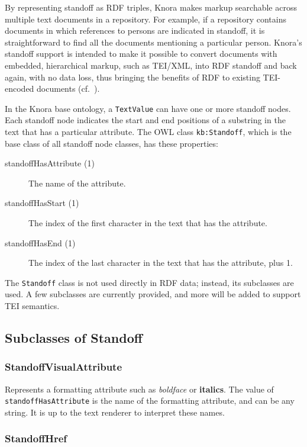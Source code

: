 \documentclass[12pt, a4paper]{article}
\begin{document}
By representing standoff as RDF triples, Knora makes markup searchable across multiple text documents in a repository. For example, if a repository contains documents in which references to persons are indicated in standoff, it is straightforward to find all the documents mentioning a particular person. Knora's standoff support is intended to make it possible to convert documents with embedded, hierarchical markup, such as TEI/XML, into RDF standoff and back again, with no data loss, thus bringing the benefits of RDF to existing TEI-encoded documents (cf.~\cite[3]{Schmidt_Standoff}).

In the Knora base ontology, a \texttt{TextValue} can have one or more standoff nodes. Each standoff node indicates the start and end positions of a substring in the text that has a particular attribute. The OWL class \texttt{kb:Standoff}, which is the base class of all standoff node classes, has these properties:

\begin{description}
	\item[standoffHasAttribute (1)] The name of the attribute.
	\item[standoffHasStart (1)] The index of the first character in the text that has the attribute.
	\item[standoffHasEnd (1)] The index of the last character in the text that has the attribute, plus 1.
\end{description}

The \texttt{Standoff} class is not used directly in RDF data; instead, its subclasses are used. A few subclasses are currently provided, and more will be added to support TEI semantics.

\subsection{Subclasses of Standoff}

\subsubsection{StandoffVisualAttribute}

Represents a formatting attribute such as {\it boldface} or {\bf italics}. The value of \texttt{standoffHasAttribute} is the name of the formatting attribute, and can be any string. It is up to the text renderer to interpret these names.

\subsubsection{StandoffHref}
\end{document}
